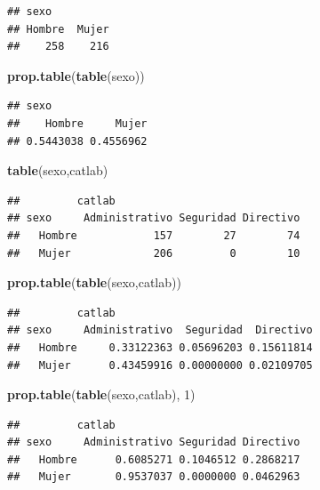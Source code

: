 \documentclass[]{book}
\newenvironment{Shaded}{\begin{snugshade}}{\end{snugshade}}
\newcommand{\KeywordTok}[1]{\textcolor[rgb]{0.13,0.29,0.53}{\textbf{#1}}}
\newcommand{\DecValTok}[1]{\textcolor[rgb]{0.00,0.00,0.81}{#1}}
\newcommand{\NormalTok}[1]{#1}
\begin{document}
\begin{verbatim}
## sexo
## Hombre  Mujer 
##    258    216
\end{verbatim}

\begin{Shaded}
\begin{Highlighting}[]
\KeywordTok{prop.table}\NormalTok{(}\KeywordTok{table}\NormalTok{(sexo))}
\end{Highlighting}
\end{Shaded}

\begin{verbatim}
## sexo
##    Hombre     Mujer 
## 0.5443038 0.4556962
\end{verbatim}

\begin{Shaded}
\begin{Highlighting}[]
\KeywordTok{table}\NormalTok{(sexo,catlab)}
\end{Highlighting}
\end{Shaded}

\begin{verbatim}
##         catlab
## sexo     Administrativo Seguridad Directivo
##   Hombre            157        27        74
##   Mujer             206         0        10
\end{verbatim}

\begin{Shaded}
\begin{Highlighting}[]
\KeywordTok{prop.table}\NormalTok{(}\KeywordTok{table}\NormalTok{(sexo,catlab))}
\end{Highlighting}
\end{Shaded}

\begin{verbatim}
##         catlab
## sexo     Administrativo  Seguridad  Directivo
##   Hombre     0.33122363 0.05696203 0.15611814
##   Mujer      0.43459916 0.00000000 0.02109705
\end{verbatim}

\begin{Shaded}
\begin{Highlighting}[]
\KeywordTok{prop.table}\NormalTok{(}\KeywordTok{table}\NormalTok{(sexo,catlab), }\DecValTok{1}\NormalTok{)}
\end{Highlighting}
\end{Shaded}

\begin{verbatim}
##         catlab
## sexo     Administrativo Seguridad Directivo
##   Hombre      0.6085271 0.1046512 0.2868217
##   Mujer       0.9537037 0.0000000 0.0462963
\end{verbatim}
\end{document}
